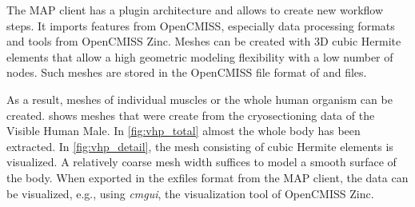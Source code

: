 The MAP client has a plugin architecture and allows to create new workflow steps. It imports features from OpenCMISS, especially data processing formats and tools from OpenCMISS Zinc. Meshes can be created with 3D cubic Hermite elements that allow a high geometric modeling flexibility with a low number of nodes. Such meshes are stored in the OpenCMISS file format of  and  files.

As a result, meshes of individual muscles or the whole human organism can be created.  shows meshes that were create from the cryosectioning data of the Visible Human Male. In \cref{fig:vhp_total} almost the whole body has been extracted. In \cref{fig:vhp_detail}, the mesh consisting of cubic Hermite elements is visualized. A relatively coarse mesh width suffices to model a smooth surface of the body. When exported in the exfiles format from the MAP client, the data can be visualized, e.g., using \emph{cmgui}, the visualization tool of OpenCMISS Zinc.

